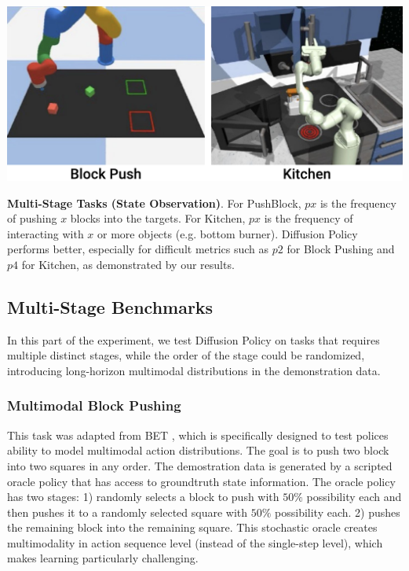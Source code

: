 \begin{table}[t]
\centering
\includegraphics[width=0.9\linewidth]{figure/multitask_thumbnails.pdf}

\vspace{2mm}

\caption{\textbf{Multi-Stage Tasks (State Observation)}. 
\label{tab:multi_stage}
For PushBlock, $px$ is the frequency of pushing $x$ blocks into the targets. 
For Kitchen, $px$ is the frequency of interacting with $x$ or more objects (e.g. bottom burner). 
Diffusion Policy performs better, especially for difficult metrics such as $p2$ for Block Pushing and $p4$ for Kitchen, as demonstrated by our results.
}
\end{table}

 
\subsection{Multi-Stage Benchmarks}
In this part of the experiment, we test Diffusion Policy on tasks that requires multiple distinct stages, while the order of the stage could be randomized, introducing long-horizon multimodal distributions in the demonstration data. 

\subsubsection{\textbf{Multimodal Block Pushing}} This task was adapted from BET \cite{bet}, which is specifically designed to test polices ability to model multimodal action distributions. The goal is to push two block into two squares in any order. The demostration data is generated by a scripted oracle policy that has access to groundtruth state information. The oracle policy has two stages: 1) randomly selects a block to push with $50\% $ possibility each and then pushes it to a randomly selected square with $50\% $ possibility each. 2) pushes the remaining block into the remaining square. This stochastic oracle creates multimodality in action sequence level (instead of the single-step level), which makes learning particularly challenging.

